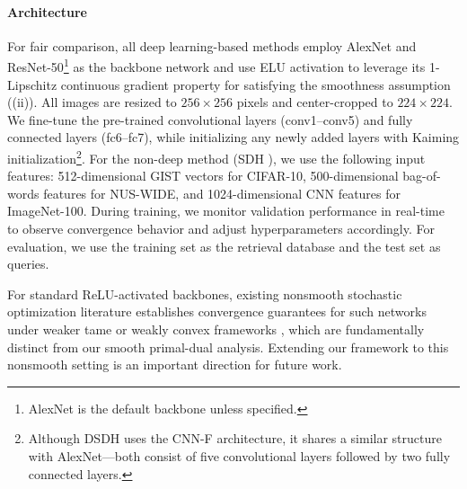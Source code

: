 \paragraph{Architecture} For fair comparison, all deep learning-based methods employ AlexNet and ResNet-50\footnote{AlexNet is the default backbone unless specified.} as the 
backbone network and use ELU activation to leverage its 
1-Lipschitz continuous gradient property for satisfying the smoothness assumption ((ii)).
All images are resized to $256 \times 256$ pixels and center-cropped to 
$224 \times 224$. We fine-tune the pre-trained convolutional layers 
(conv1--conv5) and fully connected layers (fc6--fc7), while initializing 
any newly added layers with Kaiming initialization\footnote{Although DSDH \cite{li2017deep} uses the CNN-F architecture, it shares a similar structure with AlexNet—both consist of five convolutional layers followed by two fully connected layers.}.
For the non-deep method (SDH \cite{shenSupervisedDiscreteHashing2015}), we use the following input features: 512-dimensional GIST vectors for CIFAR-10, 500-dimensional bag-of-words features for NUS-WIDE, and 1024-dimensional CNN features for ImageNet-100. During training, we monitor validation performance in real-time to observe convergence behavior and adjust hyperparameters accordingly. For evaluation, we use the training set as the retrieval database and the test set as queries.
\begin{remark}{For standard ReLU-activated backbones, existing nonsmooth stochastic optimization literature establishes convergence guarantees for such networks under weaker tame or weakly convex frameworks \cite{davis2020stochastic,maiConvergenceStochasticGradient2020}, which are fundamentally distinct from our smooth primal-dual analysis. Extending our framework to this nonsmooth setting is an important direction for future work.}
\end{remark}

